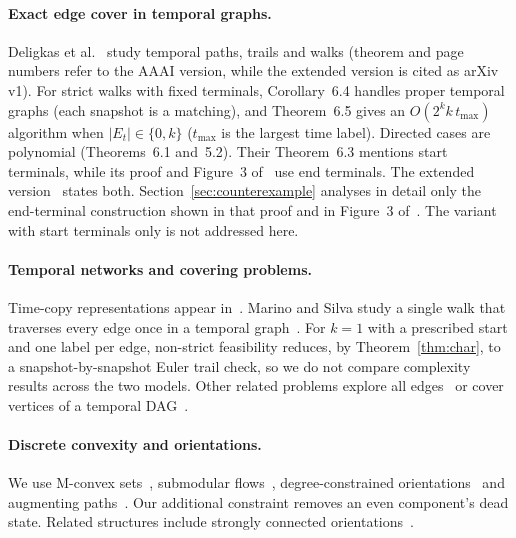 \paragraph{Exact edge cover in temporal graphs.}
Deligkas et al.~\cite{deligkas2025} study temporal paths, trails and walks (theorem and page numbers refer to the AAAI version, while the extended version is cited as arXiv v1). For strict walks with fixed terminals, Corollary~6.4 handles proper temporal graphs (each snapshot is a matching), and Theorem~6.5 gives an $O(2^k k\,t_{\max})$ algorithm when $|E_t|\in\{0,k\}$ ($t_{\max}$ is the largest time label). Directed cases are polynomial (Theorems~6.1 and~5.2). Their Theorem~6.3 mentions start terminals, while its proof and Figure~3 of~\cite{deligkas2025} use end terminals. The extended version~\cite{deligkas2024arxiv} states both. Section~\ref{sec:counterexample} analyses in detail only the end-terminal construction shown in that proof and in Figure~3 of~\cite{deligkas2025}. The variant with start terminals only is not addressed here.

\paragraph{Temporal networks and covering problems.}
Time-copy representations appear in~\cite{akrida2019}. Marino and Silva study a single walk that traverses every edge once in a temporal graph~\cite{marino2023}. For $k=1$ with a prescribed start and one label per edge, non-strict feasibility reduces, by Theorem~\ref{thm:char}, to a snapshot-by-snapshot Euler trail check, so we do not compare complexity results across the two models. Other related problems explore all edges~\cite{bumpus2023} or cover vertices of a temporal DAG~\cite{chakraborty2024}.

\paragraph{Discrete convexity and orientations.}
We use M-convex sets~\cite{murota1996,murota2003}, submodular flows~\cite{edmonds1977,franktardos1988,murota2003,fujishige2005}, degree-constrained orientations~\cite{hakimi1965,frank1980,frank2011} and augmenting paths~\cite{cunningham1985,fujishige2005}. Our additional constraint removes an even component's dead state. Related structures include strongly connected orientations~\cite{abdi2025}.
